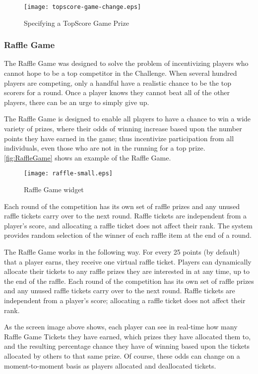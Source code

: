 \begin{figure}[!ht]
  \center
  \texttt{[image: topscore-game-change.eps]}
  \caption{Specifying a TopScore Game Prize}
  \label{fig:topscore-game-change}
\end{figure}

\clearpage

\subsubsection{Raffle Game}

The Raffle Game was designed to solve the problem of incentivizing players who cannot hope to be a top competitor in the Challenge. When several hundred players are competing, only a handful have a realistic chance to be the top scorers for a round. Once a player knows they cannot beat all of the other players, there can be an urge to simply give up.

The Raffle Game is designed to enable all players to have a chance to win a wide variety of prizes, where their odds of winning increase based upon the number points they have earned in the game; thus incentivize participation from all individuals, even those who are not in the running for a top prize. \autoref{fig:RaffleGame} shows an example of the Raffle Game.

\begin{figure}[!ht]
  \center
  \texttt{[image: raffle-small.eps]}
  \caption{Raffle Game widget}
  \label{fig:RaffleGame}
\end{figure}

Each round of the competition has its own set of raffle prizes and any unused raffle tickets carry over to the next round. Raffle tickets are independent from a player's score, and allocating a raffle ticket does not affect their rank. The system provides random selection of the winner of each raffle item at the end of a round.

The Raffle Game works in the following way. For every 25 points (by default) that a player earns, they receive one virtual raffle ticket. Players can dynamically allocate their tickets to any raffle prizes they are interested in at any time, up to the end of the raffle. Each round of the competition has its own set of raffle prizes and any unused raffle tickets carry over to the next round. Raffle tickets are independent from a player's score; allocating a raffle ticket does not affect their rank.

As the screen image above shows, each player can see in real-time how many Raffle Game Tickets they have earned, which prizes they have allocated them to, and the resulting percentage chance they have of winning based upon the tickets allocated by others to that same prize. Of course, these odds can change on a moment-to-moment basis as players allocated and deallocated tickets.

